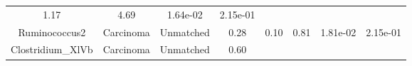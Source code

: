 \documentclass[12pt,]{article}
\begin{document}
\begin{longtable}[]{@{}cccccccc@{}}
\begin{minipage}[t]{0.14\columnwidth}
1.17\strut
\end{minipage} & \begin{minipage}[t]{0.14\columnwidth}\centering\strut
4.69\strut
\end{minipage} & \begin{minipage}[t]{0.06\columnwidth}\centering\strut
1.64e-02\strut
\end{minipage} & \begin{minipage}[t]{0.06\columnwidth}\centering\strut
2.15e-01\strut
\end{minipage}\tabularnewline
\begin{minipage}[t]{0.18\columnwidth}\centering\strut
Ruminococcus2\strut
\end{minipage} & \begin{minipage}[t]{0.07\columnwidth}\centering\strut
Carcinoma\strut
\end{minipage} & \begin{minipage}[t]{0.09\columnwidth}\centering\strut
Unmatched\strut
\end{minipage} & \begin{minipage}[t]{0.03\columnwidth}\centering\strut
0.28\strut
\end{minipage} & \begin{minipage}[t]{0.14\columnwidth}\centering\strut
0.10\strut
\end{minipage} & \begin{minipage}[t]{0.14\columnwidth}\centering\strut
0.81\strut
\end{minipage} & \begin{minipage}[t]{0.06\columnwidth}\centering\strut
1.81e-02\strut
\end{minipage} & \begin{minipage}[t]{0.06\columnwidth}\centering\strut
2.15e-01\strut
\end{minipage}\tabularnewline
\begin{minipage}[t]{0.18\columnwidth}\centering\strut
Clostridium\_XlVb\strut
\end{minipage} & \begin{minipage}[t]{0.07\columnwidth}\centering\strut
Carcinoma\strut
\end{minipage} & \begin{minipage}[t]{0.09\columnwidth}\centering\strut
Unmatched\strut
\end{minipage} & \begin{minipage}[t]{0.03\columnwidth}\centering\strut
0.60\strut
\end{minipage} & \begin{minipage}[t]{0.14\columnwidth}\centering\strut

\end{minipage}
\end{longtable}
\end{document}
